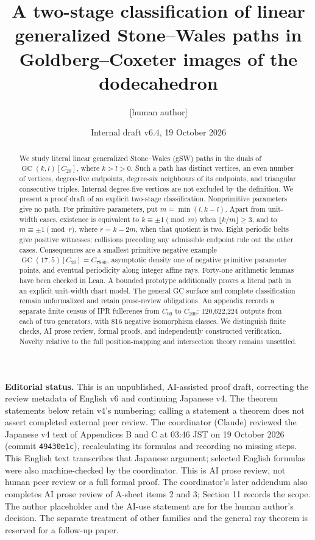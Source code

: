 \documentclass[11pt]{amsart}
\title[Two-stage classification of linear gSW paths]{A two-stage classification of linear generalized Stone--Wales paths in Goldberg--Coxeter images of the dodecahedron}
\author{[human author]}
\date{Internal draft v6.4, 19 October 2026}
\newcommand{\GC}{\operatorname{GC}}
\newcommand{\record}[1]{\nolinkurl{#1}}
\begin{document}
\begin{abstract}
We study literal linear generalized Stone--Wales (gSW) paths in the duals
of $\GC(k,l)[C_{20}]$, where $k>l>0$. Such a path has distinct vertices,
an even number of vertices, degree-five endpoints, degree-six neighbours
of its endpoints, and triangular consecutive triples. Internal
degree-five vertices are not excluded by the definition. We present a
proof draft of an explicit two-stage classification. Nonprimitive
parameters give no path. For primitive parameters, put $m=\min(l,k-l)$.
Apart from unit-width cases, existence is equivalent to $k\equiv\pm1
\pmod m$ when $\lfloor k/m\rfloor\ge3$, and to $m\equiv\pm1\pmod r$,
where $r=k-2m$, when that quotient is two. Eight periodic belts give
positive witnesses; collisions preceding any admissible endpoint rule
out the other cases. Consequences are a smallest primitive negative
example $\GC(17,5)[C_{20}]=C_{7980}$, asymptotic density one of negative
primitive parameter points, and eventual periodicity along integer
affine rays. Forty-one arithmetic lemmas have been checked in Lean. A bounded
prototype additionally proves a literal path in an explicit unit-width
chart model. The general GC surface and complete classification remain
unformalized and retain prose-review obligations. An appendix records a
separate finite census of IPR fullerenes from $C_{60}$ to $C_{200}$:
120,622,224 outputs from each of two generators, with 816 negative
isomorphism classes. We distinguish finite checks, AI prose review,
formal proofs, and independently constructed verification. Novelty
relative to the full position-mapping and intersection theory remains
unsettled.
\end{abstract}
\maketitle

\noindent\textbf{Editorial status.} This is an unpublished, AI-assisted
proof draft, correcting the review metadata of English v6 and continuing Japanese v4. The theorem statements below
retain v4's numbering; calling a statement a theorem does not assert
completed external peer review. The coordinator (Claude) reviewed the
Japanese v4 text of Appendices B and C at 03:46 JST on 19 October 2026
(commit \record{49430e1c}), recalculating its formulas and recording no
missing steps. This English text transcribes that Japanese argument;
selected English formulas were also machine-checked by the coordinator.
This is AI prose review, not human peer review or a full formal proof.
The coordinator's later addendum also completes AI prose review of A-sheet items 2 and 3; Section 11 records the scope. The author placeholder and the AI-use statement are
for the human author's decision. The separate treatment of other
families and the general ray theorem is reserved for a follow-up paper.
\end{document}
